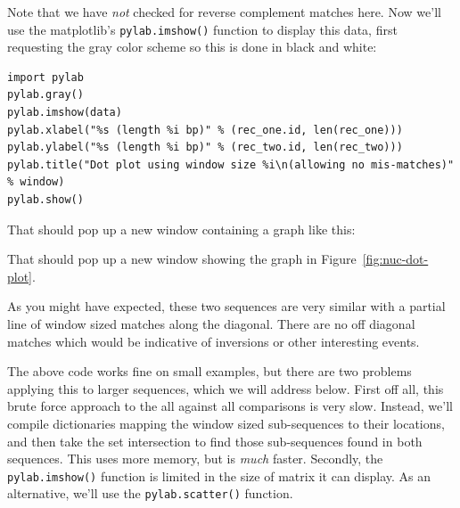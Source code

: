 \documentclass{report}
\begin{document}
Note that we have \emph{not} checked for reverse complement matches here.
Now we'll use the matplotlib's \verb|pylab.imshow()| function to display this
data, first requesting the gray color scheme so this is done in black and
white:

\begin{verbatim}
import pylab
pylab.gray()
pylab.imshow(data)
pylab.xlabel("%s (length %i bp)" % (rec_one.id, len(rec_one)))
pylab.ylabel("%s (length %i bp)" % (rec_two.id, len(rec_two)))
pylab.title("Dot plot using window size %i\n(allowing no mis-matches)" % window)
pylab.show()
\end{verbatim}

%
%
\begin{htmlonly}
\noindent That should pop up a new window containing a graph like this:


\end{htmlonly}
\begin{latexonly}
\noindent That should pop up a new window showing the graph in Figure~\ref{fig:nuc-dot-plot}.
\end{latexonly}
%
%
As you might have expected, these two sequences are very similar with a
partial line of window sized matches along the diagonal.  There are no off
diagonal matches which would be indicative of inversions or other interesting
events.

The above code works fine on small examples, but there are two problems
applying this to larger sequences, which we will address below.
First off all, this brute force approach to the all against all comparisons
is very slow.  Instead, we'll compile dictionaries mapping the window sized
sub-sequences to their locations, and then take the set intersection to find
those sub-sequences found in both sequences. This uses more memory, but is
\emph{much} faster.  Secondly, the \verb|pylab.imshow()| function is limited
in the size of matrix it can display.  As an alternative, we'll use the
\verb|pylab.scatter()| function.
\end{document}
